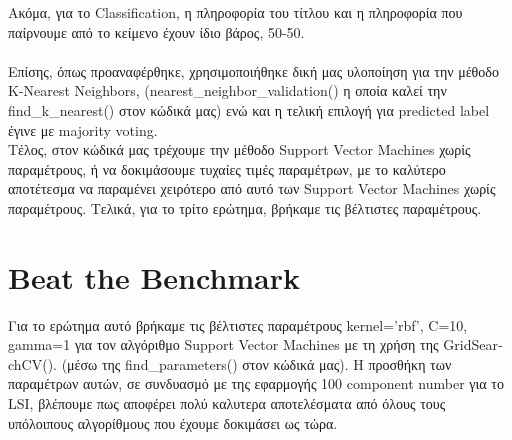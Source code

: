 \documentclass{article}
\begin{document}
Ακόμα, για το \textlatin{Classification}, η πληροφορία του τίτλου και η πληροφορία που παίρνουμε από το κείμενο
έχουν ίδιο βάρος, 50-50.\\\\

Επίσης, όπως προαναφέρθηκε, χρησιμοποιήθηκε δική μας υλοποίηση για την μέθοδο \textlatin{K-Nearest Neighbors},
\textlatin{(nearest\_neighbor\_validation()} η οποία καλεί την\\ \textlatin{find\_k\_nearest()} στον κώδικά μας)
ενώ και η τελική επιλογή για \textlatin{predicted label} έγινε με \textlatin{majority voting}.\\

Τέλος, στον κώδικά μας τρέχουμε την μέθοδο \textlatin{Support Vector Machines} χωρίς παραμέτρους, ή να δοκιμάσουμε
τυχαίες τιμές παραμέτρων, με το καλύτερο αποτέτεσμα να παραμένει χειρότερο από αυτό των 
\textlatin{Support Vector Machines} χωρίς παραμέτρους. Τελικά, για το τρίτο ερώτημα, βρήκαμε τις βέλτιστες παραμέτρους. 

\section{\textlatin{Beat the Benchmark}}
Για το ερώτημα αυτό βρήκαμε τις βέλτιστες παραμέτρους \textlatin{kernel='rbf', C=10, gamma=1} για τον αλγόριθμο \textlatin{Support Vector Machines} 
με τη χρήση της \textlatin{GridSearchCV()}. (μέσω της \textlatin{find\_parameters()} στον κώδικά μας). Η προσθήκη των παραμέτρων αυτών,
σε συνδυασμό με της εφαρμογής 100 \textlatin{component number} για το \textlatin{LSI}, βλέπουμε πως αποφέρει πολύ καλυτερα αποτελέσματα από όλους τους 
υπόλοιπους αλγορίθμους που έχουμε δοκιμάσει ως τώρα. 
\end{document}
